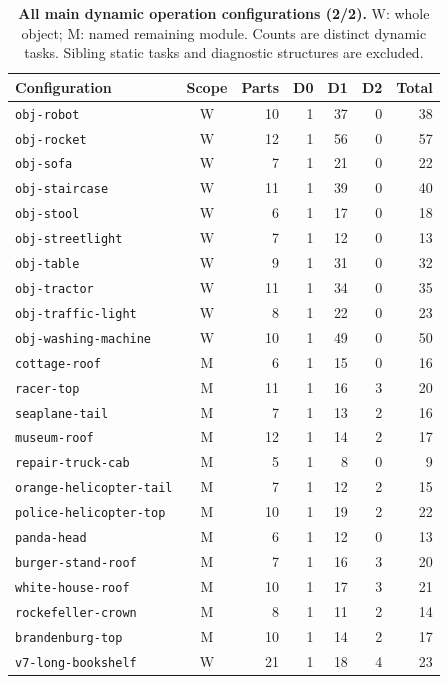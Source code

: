 \begin{table}[!ht]
\centering\footnotesize
\caption{\textbf{All main dynamic operation configurations (2/2).} W: whole object; M: named remaining module. Counts are distinct dynamic tasks. Sibling static tasks and diagnostic structures are excluded.}
\begin{tabularx}{\textwidth}{@{}Xcrrrrr@{}}
\toprule
Configuration & Scope & Parts & D0 & D1 & D2 & Total\\
\midrule
\texttt{obj-robot} & W & 10 & 1 & 37 & 0 & 38\\
\texttt{obj-rocket} & W & 12 & 1 & 56 & 0 & 57\\
\texttt{obj-sofa} & W & 7 & 1 & 21 & 0 & 22\\
\texttt{obj-staircase} & W & 11 & 1 & 39 & 0 & 40\\
\texttt{obj-stool} & W & 6 & 1 & 17 & 0 & 18\\
\texttt{obj-streetlight} & W & 7 & 1 & 12 & 0 & 13\\
\texttt{obj-table} & W & 9 & 1 & 31 & 0 & 32\\
\texttt{obj-tractor} & W & 11 & 1 & 34 & 0 & 35\\
\texttt{obj-traffic-light} & W & 8 & 1 & 22 & 0 & 23\\
\texttt{obj-washing-machine} & W & 10 & 1 & 49 & 0 & 50\\
\texttt{cottage-roof} & M & 6 & 1 & 15 & 0 & 16\\
\texttt{racer-top} & M & 11 & 1 & 16 & 3 & 20\\
\texttt{seaplane-tail} & M & 7 & 1 & 13 & 2 & 16\\
\texttt{museum-roof} & M & 12 & 1 & 14 & 2 & 17\\
\texttt{repair-truck-cab} & M & 5 & 1 & 8 & 0 & 9\\
\texttt{orange-helicopter-tail} & M & 7 & 1 & 12 & 2 & 15\\
\texttt{police-helicopter-top} & M & 10 & 1 & 19 & 2 & 22\\
\texttt{panda-head} & M & 6 & 1 & 12 & 0 & 13\\
\texttt{burger-stand-roof} & M & 7 & 1 & 16 & 3 & 20\\
\texttt{white-house-roof} & M & 10 & 1 & 17 & 3 & 21\\
\texttt{rockefeller-crown} & M & 8 & 1 & 11 & 2 & 14\\
\texttt{brandenburg-top} & M & 10 & 1 & 14 & 2 & 17\\
\texttt{v7-long-bookshelf} & W & 21 & 1 & 18 & 4 & 23\\

\end{tabularx}
\end{table}
